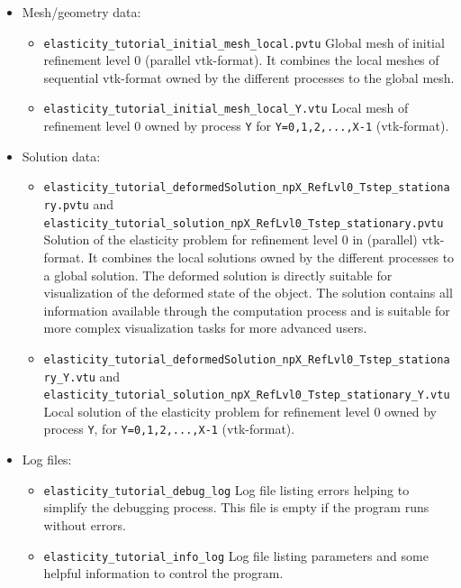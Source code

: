 \documentclass[a4paper, 11pt, twoside]{article}
\theoremstyle{plain}
\theoremstyle{definition}
\begin{document}
\begin{itemize}
  \item Mesh/geometry data:
    \begin{itemize}
      \item \texttt{elasticity\_tutorial\_initial\_mesh\_local.pvtu} Global mesh of initial refinement level 0 (parallel vtk-format). It combines the local meshes of sequential vtk-format owned by the different processes to the global mesh.
      \item \texttt{elasticity\_tutorial\_initial\_mesh\_local\_Y.vtu} Local mesh of refinement level 0 owned by process \verb'Y' for \verb'Y=0,1,2,...,X-1' (vtk-format).
    \end{itemize}
    
  \item Solution data:
    \begin{itemize}
      \item \texttt{elasticity\_tutorial\_deformedSolution\_npX\_RefLvl0\_Tstep\_stationary.pvtu} and \verb'elasticity_tutorial_solution_npX_RefLvl0_Tstep_stationary.pvtu' \\  
      Solution of the elasticity problem for refinement level 0 in (parallel) vtk-format. 
      It combines the local solutions owned by the different processes to a global solution.
      The deformed solution is directly suitable for visualization of the deformed state of the object.
      The solution contains all information available through the computation process and is suitable for more complex visualization tasks for more advanced users.
      
      \item \texttt{elasticity\_tutorial\_deformedSolution\_npX\_RefLvl0\_Tstep\_stationary\_Y.vtu} and \texttt{elasticity\_tutorial\_solution\_npX\_RefLvl0\_Tstep\_stationary\_Y.vtu} \\
      Local solution of the elasticity problem for refinement level 0 owned by process \verb'Y', for \verb'Y=0,1,2,...,X-1' (vtk-format).
    \end{itemize}
    
  \item Log files:
    \begin{itemize}
      \item \texttt{elasticity\_tutorial\_debug\_log} Log file listing errors helping to simplify the debugging process. This file is empty if the program runs without errors.
      
      \item \texttt{elasticity\_tutorial\_info\_log} Log file listing parameters and some helpful information to control the program.
    \end{itemize}
    

\end{itemize}
\end{document}

